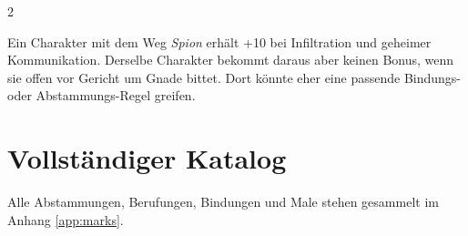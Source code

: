 \begin{multicols*}{2}
\begin{ruleexample}
Ein Charakter mit dem Weg \textit{Spion} erhält +10 bei Infiltration und geheimer Kommunikation.
Derselbe Charakter bekommt daraus aber keinen Bonus, wenn sie offen vor Gericht um Gnade bittet.
Dort könnte eher eine passende Bindungs- oder Abstammungs-Regel greifen.
\end{ruleexample}

\section{Vollständiger Katalog}\label{sec:vollstandiger-katalog}
Alle Abstammungen, Berufungen, Bindungen und Male stehen gesammelt im Anhang \cref{app:marks}.
\end{multicols*}
